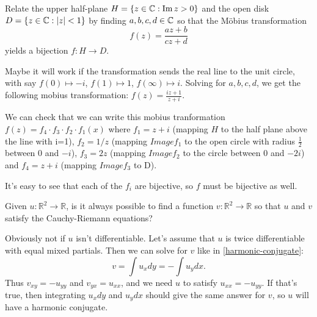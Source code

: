 \documentclass{homework}
\begin{document}
                         \begin{problem}\label{cayley-transform}Relate the upper half-plane
                           $H = \{ z \in \mathbb{C} : \operatorname{Im} z > 0 \}$ and the open disk
                             $D = \{ z \in \mathbb{C} : \left|z\right| < 1 \}$ by finding $a,b,c,d \in \mathbb{C}$ so that the M\"obius transformation
                               \[f(z) = \frac{az + b}{cz + d}\] yields a bijection $f : H \to D$.
                               \end{problem}
                               \begin{solution}
                               Maybe it will work if the transformation sends the real line to the unit circle, with say $f(0)\mapsto -i$, $f(1)\mapsto 1$, $f(\infty)\mapsto i$. Solving for $a,b,c,d$, we get the following mobius transformation:
                               $f(z) = \frac{iz+1}{z + i}.$

                               We can check that we can write this mobius tranformation $f(z) = f_4\cdot f_3 \cdot f_2 \cdot f_1(x)$ where $f_1 = z + i$ (mapping $H$ to the half plane above the line with i=1), $f_2 = 1/z$ (mapping $Image f_1$ to the open circle with radius $\frac{1}{2}$ between 0 and $-i$), $f_3 = 2z$ (mapping $Image f_2$ to the circle between 0 and $-2i$) and $f_4 = z + i$ (mapping $Image f_3$ to D).

                               It's easy to see that each of the $f_i$ are bijective, so $f$ must be bijective as well.
                               \end{solution}


                               \begin{problem}\label{harmonic-necessary}Given $u : \mathbb{R}^2 \to \mathbb{R}$, is it always possible to
                                 find a function $v : \mathbb{R}^2 \to \mathbb{R}$ so that $u$ and
                                   $v$ satisfy the Cauchy-Riemann equations?
                                   \end{problem}
                                   \begin{solution}
                                   Obviously not if $u$ isn't differentiable. Let's assume that $u$ is twice differentiable with equal mixed partials. Then we can solve for $v$ like in \ref{harmonic-conjugate}:
                                   \[v = \int u_x dy = -\int u_y dx.\]
                                   Thus $v_{xy} = -u_{yy}$ and $v_{yx} = u_{xx}$, and we need $u$ to satisfy $u_{xx} = -u_{yy}$. If that's true, then integrating $u_xdy$ and $u_ydx$ should give the same answer for $v$, so $u$ will have a harmonic conjugate.
                                   \end{solution}
\end{document}
